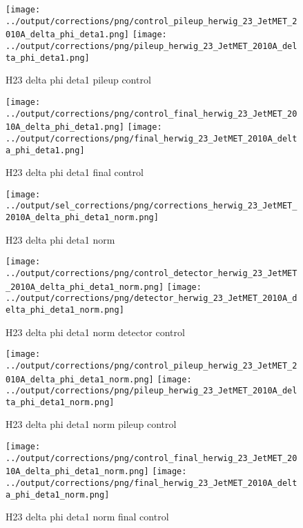 \documentclass[11pt]{book}
\begin{document}
\begin{figure}[ht]
\centering
\texttt{[image: ../output/corrections/png/control\_pileup\_herwig\_23\_JetMET\_2010A\_delta\_phi\_deta1.png]}
\texttt{[image: ../output/corrections/png/pileup\_herwig\_23\_JetMET\_2010A\_delta\_phi\_deta1.png]}
\caption{H23 delta phi deta1 pileup control}
\label{fig:H23_JetMET_2010A_delta_phi_deta1_pileup_control}
\end{figure}


\begin{figure}[ht]
\centering
\texttt{[image: ../output/corrections/png/control\_final\_herwig\_23\_JetMET\_2010A\_delta\_phi\_deta1.png]}
\texttt{[image: ../output/corrections/png/final\_herwig\_23\_JetMET\_2010A\_delta\_phi\_deta1.png]}
\caption{H23 delta phi deta1 final control}
\label{fig:H23_JetMET_2010A_delta_phi_deta1_final_control}
\end{figure}


\begin{figure}[ht]
\centering
\texttt{[image: ../output/sel\_corrections/png/corrections\_herwig\_23\_JetMET\_2010A\_delta\_phi\_deta1\_norm.png]}
\caption{H23 delta phi deta1 norm}
\label{fig:H23_JetMET_2010A_delta_phi_deta1_norm}
\end{figure}

\begin{figure}[ht]
\centering
\texttt{[image: ../output/corrections/png/control\_detector\_herwig\_23\_JetMET\_2010A\_delta\_phi\_deta1\_norm.png]}
\texttt{[image: ../output/corrections/png/detector\_herwig\_23\_JetMET\_2010A\_delta\_phi\_deta1\_norm.png]}
\caption{H23 delta phi deta1 norm detector control}
\label{fig:H23_JetMET_2010A_delta_phi_deta1_norm_detector_control}
\end{figure}

\begin{figure}[ht]
\centering
\texttt{[image: ../output/corrections/png/control\_pileup\_herwig\_23\_JetMET\_2010A\_delta\_phi\_deta1\_norm.png]}
\texttt{[image: ../output/corrections/png/pileup\_herwig\_23\_JetMET\_2010A\_delta\_phi\_deta1\_norm.png]}
\caption{H23 delta phi deta1 norm pileup control}
\label{fig:H23_JetMET_2010A_delta_phi_deta1_norm_pileup_control}
\end{figure}


\begin{figure}[ht]
\centering
\texttt{[image: ../output/corrections/png/control\_final\_herwig\_23\_JetMET\_2010A\_delta\_phi\_deta1\_norm.png]}
\texttt{[image: ../output/corrections/png/final\_herwig\_23\_JetMET\_2010A\_delta\_phi\_deta1\_norm.png]}
\caption{H23 delta phi deta1 norm final control}
\label{fig:H23_JetMET_2010A_delta_phi_deta1_norm_final_control}
\end{figure}
\end{document}
